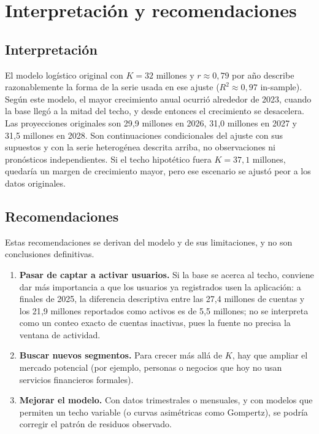 \documentclass[12pt,a4paper]{article}
\begin{document}
\section{Interpretaci\'on y recomendaciones}

\subsection{Interpretaci\'on}
El modelo log\'istico original con $K=32$ millones y $r\approx 0{,}79$ por a\~no describe razonablemente la forma de la serie usada en ese ajuste ($R^2\approx 0{,}97$ in-sample). Seg\'un este modelo, el mayor crecimiento anual ocurri\'o alrededor de 2023, cuando la base lleg\'o a la mitad del techo, y desde entonces el crecimiento se desacelera. Las proyecciones originales son 29{,}9 millones en 2026, 31{,}0 millones en 2027 y 31{,}5 millones en 2028. Son continuaciones condicionales del ajuste con sus supuestos y con la serie heterog\'enea descrita arriba, no observaciones ni pron\'osticos independientes. Si el techo hipot\'etico fuera $K=37{,}1$ millones, quedar\'ia un margen de crecimiento mayor, pero ese escenario se ajust\'o peor a los datos originales.

\subsection{Recomendaciones}
Estas recomendaciones se derivan del modelo y de sus limitaciones, y no son conclusiones definitivas.
\begin{enumerate}
  \item \textbf{Pasar de captar a activar usuarios.} Si la base se acerca al techo, conviene dar m\'as importancia a que los usuarios ya registrados usen la aplicaci\'on: a finales de 2025, la diferencia descriptiva entre las 27{,}4 millones de cuentas y los 21{,}9 millones reportados como activos es de 5{,}5 millones; no se interpreta como un conteo exacto de cuentas inactivas, pues la fuente no precisa la ventana de actividad.
  \item \textbf{Buscar nuevos segmentos.} Para crecer m\'as all\'a de $K$, hay que ampliar el mercado potencial (por ejemplo, personas o negocios que hoy no usan servicios financieros formales).
  \item \textbf{Mejorar el modelo.} Con datos trimestrales o mensuales, y con modelos que permiten un techo variable (o curvas asim\'etricas como Gompertz), se podr\'ia corregir el patr\'on de residuos observado.
\end{enumerate}
\end{document}
